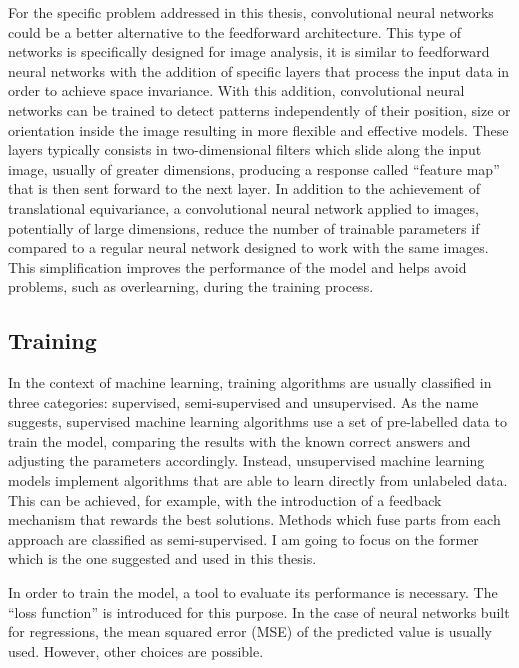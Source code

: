 \documentclass[a4paper,10pt]{report}
\begin{document}
For the specific problem addressed in this thesis, convolutional neural networks could be a better alternative 
to the feedforward architecture.
This type of networks is specifically designed for image analysis, 
it is similar to feedforward neural networks with the addition
of specific layers that process the input data in order to achieve 
space invariance. With this addition, convolutional neural networks can be trained
to detect patterns independently of their position, size or orientation inside the image
resulting in more flexible and effective models.
These layers typically consists in two-dimensional filters which slide along the input image, usually of greater dimensions, 
producing a response called ``feature map'' that is then sent forward to the next layer.
In addition to the achievement of translational equivariance, a convolutional neural network
applied to images, potentially of large dimensions, reduce the number of trainable parameters
if compared to a regular neural network designed to work with the same images. This simplification improves the
performance of the model and helps avoid problems, such as overlearning, during the training process.

\subsection{Training}

In the context of machine learning, training algorithms are usually classified in three categories: 
supervised, semi-supervised and unsupervised.
As the name suggests, supervised machine learning algorithms use a set of pre-labelled data to 
train the model, comparing the results with the known correct answers and adjusting the parameters 
accordingly.
Instead, unsupervised machine learning models implement algorithms that are able to learn directly from 
unlabeled data. This can be achieved, for example, with the introduction of a feedback mechanism that rewards
the best solutions.
Methods which fuse parts from each approach are classified as semi-supervised. I am going to focus on the
former which is the one suggested and used in this thesis.

In order to train the model, a tool to evaluate its performance is necessary.
The ``loss function'' is introduced for this purpose. In the case of neural networks built for 
regressions, the mean squared error (MSE) of the predicted value
is usually used. However, other choices are possible.
\end{document}
